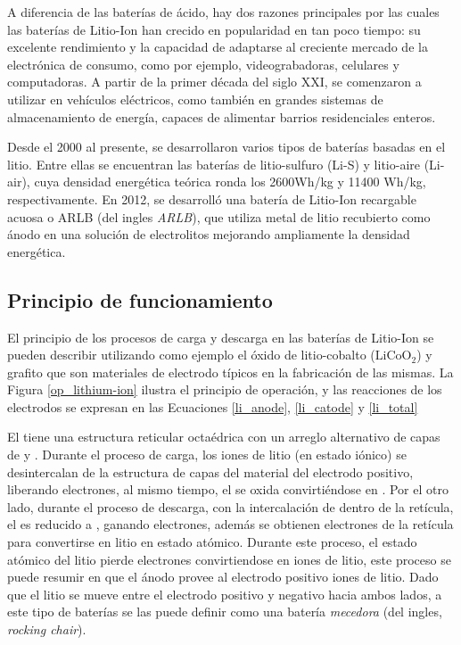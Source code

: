 \noindent A diferencia de las baterías de ácido, hay dos razones principales por
las cuales las baterías de Litio-Ion han crecido en popularidad en tan poco
tiempo: su excelente rendimiento y la capacidad de adaptarse al creciente
mercado de la electrónica de consumo, como por ejemplo, videograbadoras,
celulares y computadoras. A partir de la primer década del siglo XXI, se
comenzaron a utilizar en vehículos eléctricos, como también en grandes sistemas
de almacenamiento de energía, capaces de alimentar barrios residenciales
enteros.

\newpage

\noindent Desde el 2000 al presente, se desarrollaron varios tipos de 
bater\'ias basadas en el litio. Entre ellas se encuentran las bater\'ias de 
litio-sulfuro (Li-S) y litio-aire (Li-air), cuya densidad energética teórica 
ronda los 2600Wh/kg y 11400 Wh/kg, respectivamente. En 2012, se desarrolló una 
batería de Litio-Ion recargable acuosa o \acrshort{ARLB} (del ingles
\emph{\acrlong{ARLB}}), que utiliza metal de litio recubierto como ánodo en una
solución de electrolitos mejorando ampliamente la densidad energética.

\subsection{Principio de funcionamiento}\label{battery_fun}

El principio de los procesos de carga y descarga en las baterías de Litio-Ion se
pueden describir utilizando como ejemplo el óxido de litio-cobalto 
($\mathrm{LiCoO_2}$) y grafito que son materiales de electrodo t\'ipicos en la
fabricaci\'on de las mismas. La Figura \ref{op_lithium-ion} ilustra el
principio de operación, y las reacciones de los electrodos se expresan en las
Ecuaciones \ref{li_anode}, \ref{li_catode} y \ref{li_total}


\noindent El  tiene una estructura reticular octa\'edrica con un
arreglo alternativo de capas de  y . Durante el proceso de
carga, los iones de litio (en estado iónico) se desintercalan de la estructura
de capas del material del electrodo positivo, liberando electrones, al mismo
tiempo, el  se oxida convirti\'endose en .  Por el otro
lado, durante el proceso de descarga, con la intercalación de  dentro de
la ret\'icula, el  es reducido a , ganando electrones,
adem\'as se obtienen electrones de la ret\'icula para convertirse en litio en 
estado atómico. Durante este proceso, el estado atómico del litio pierde 
electrones convirtiendose en iones de litio, este proceso se puede resumir en 
que el ánodo provee al electrodo positivo iones de litio. Dado que el litio se 
mueve entre el electrodo positivo y negativo hacia ambos lados, a este tipo de 
baterías se las puede definir como una batería \emph{mecedora} (del ingles,
\emph{rocking chair}).


